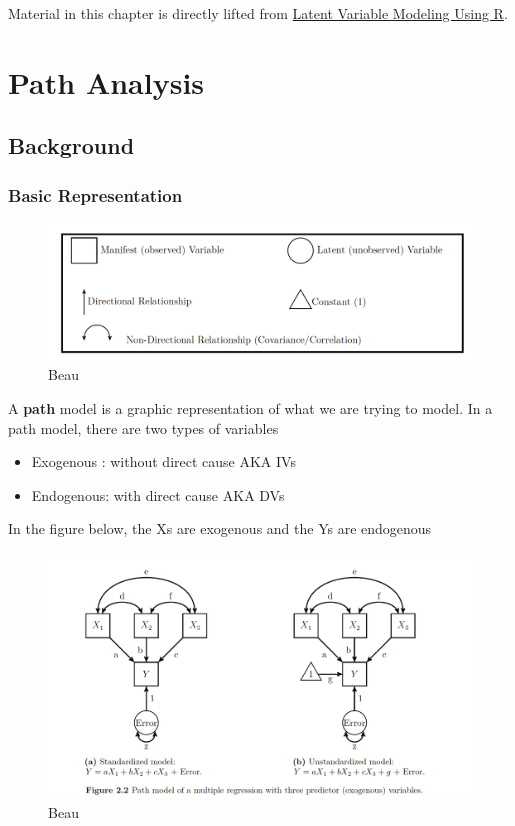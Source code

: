 \documentclass[]{book}
\providecommand{\tightlist}{%
  \setlength{\itemsep}{0pt}\setlength{\parskip}{0pt}}
\theoremstyle{definition}
\theoremstyle{definition}
\theoremstyle{definition}
\theoremstyle{remark}
\begin{document}
Material in this chapter is directly lifted from
\href{https://books.google.com/books/about/Latent_Variable_Modeling_Using_R.html?id=7hmLAwAAQBAJ\&printsec=frontcover\&source=kp_read_button\#v=onepage\&q\&f=false}{Latent
Variable Modeling Using R}.

\section{Path Analysis}\label{path-analysis}

\subsection{Background}\label{background}

\subsubsection{Basic Representation}\label{basic-representation}

\begin{figure}
\centering
\includegraphics{img/beaupath1.png}
\caption{Beau}
\end{figure}

A \textbf{path} model is a graphic representation of what we are trying
to model. In a path model, there are two types of variables

\begin{itemize}
\tightlist
\item
  Exogenous : without direct cause AKA IVs
\item
  Endogenous: with direct cause AKA DVs
\end{itemize}

In the figure below, the Xs are exogenous and the Ys are endogenous

\begin{figure}
\centering
\includegraphics{img/beaupath2.png}
\caption{Beau}
\end{figure}
\end{document}
